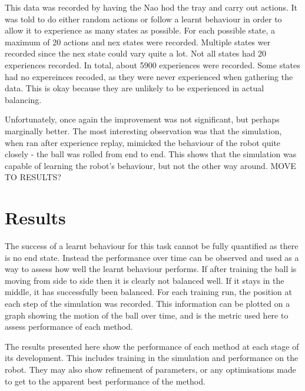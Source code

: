 \documentclass[12pt,a4paper]{article}
\begin{document}
This data was recorded by having the Nao hod the tray and carry out actions. It was told to do either random actions or follow a learnt behaviour in order to allow it to experience as many states as possible. For each possible state, a maximum of 20 actions and nex states were recorded. Multiple states wer recorded since the nex state could vary quite a lot. Not all states had 20 experiences recorded. In total, about 5900 experiences were recorded. Some states had no expereinces recoded, as they were never experienced when gathering the data. This is okay because they are unlikely to be experienced in actual balancing. 

Unfortunately, once again the improvement was not significant, but perhaps marginally better. The most interesting observation was that the simulation, when ran after experience replay, mimicked the behaviour of the robot quite closely - the ball was rolled from end to end. This shows that the simulation was capable of learning the robot's behaviour, but not the other way around. MOVE TO RESULTS?

\section{Results}
The success of a learnt behaviour for this task cannot be fully quantified as there is no end state. Instead the performance over time can be observed and used as a way to assess how well the learnt behaviour performs. If after training the ball is moving from side to side then it is clearly not balanced well. If it stays in the middle, it has successfully been balanced. For each training run, the position at each step of the simulation was recorded. This information can be plotted on a graph showing the motion of the ball over time, and is the metric used here to assess performance of each method. 

The results presented here show the performance of each method at each stage of its development. This includes training in the simulation and performance on the robot. They may also show refinement of parameters, or any optimisations made to get to the apparent best performance of the method. 
\end{document}
